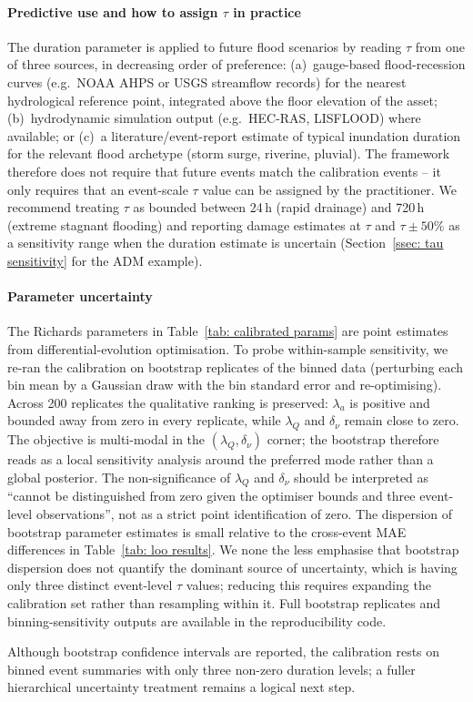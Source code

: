 \paragraph{Predictive use and how to assign $\tau$ in practice}
The duration parameter is applied to future flood scenarios by reading $\tau$ from one of three sources, in decreasing order of preference: (a)~gauge-based flood-recession curves (e.g.\ NOAA AHPS or USGS streamflow records) for the nearest hydrological reference point, integrated above the floor elevation of the asset; (b)~hydrodynamic simulation output (e.g.\ HEC-RAS, LISFLOOD) where available; or (c)~a literature/event-report estimate of typical inundation duration for the relevant flood archetype (storm surge, riverine, pluvial). The framework therefore does not require that future events match the calibration events -- it only requires that an event-scale $\tau$ value can be assigned by the practitioner. We recommend treating $\tau$ as bounded between 24\,h (rapid drainage) and 720\,h (extreme stagnant flooding) and reporting damage estimates at $\tau$ and $\tau \pm 50\%$ as a sensitivity range when the duration estimate is uncertain (Section~\ref{ssec: tau sensitivity} for the ADM example).

\paragraph{Parameter uncertainty}
The Richards parameters in Table~\ref{tab: calibrated params} are point estimates from differential-evolution optimisation. To probe within-sample sensitivity, we re-ran the calibration on bootstrap replicates of the binned data (perturbing each bin mean by a Gaussian draw with the bin standard error and re-optimising). Across 200 replicates the qualitative ranking is preserved: $\lambda_a$ is positive and bounded away from zero in every replicate, while $\lambda_Q$ and $\delta_\nu$ remain close to zero. The objective is multi-modal in the $(\lambda_Q, \delta_\nu)$ corner; the bootstrap therefore reads as a local sensitivity analysis around the preferred mode rather than a global posterior. The non-significance of $\lambda_Q$ and $\delta_\nu$ should be interpreted as ``cannot be distinguished from zero given the optimiser bounds and three event-level observations'', not as a strict point identification of zero. The dispersion of bootstrap parameter estimates is small relative to the cross-event MAE differences in Table~\ref{tab: loo results}. We none the less emphasise that bootstrap dispersion does not quantify the dominant source of uncertainty, which is having only three distinct event-level $\tau$ values; reducing this requires expanding the calibration set rather than resampling within it. Full bootstrap replicates and binning-sensitivity outputs are available in the reproducibility code.

Although bootstrap confidence intervals are reported, the calibration rests on binned event summaries with only three non-zero duration levels; a fuller hierarchical uncertainty treatment remains a logical next step.
